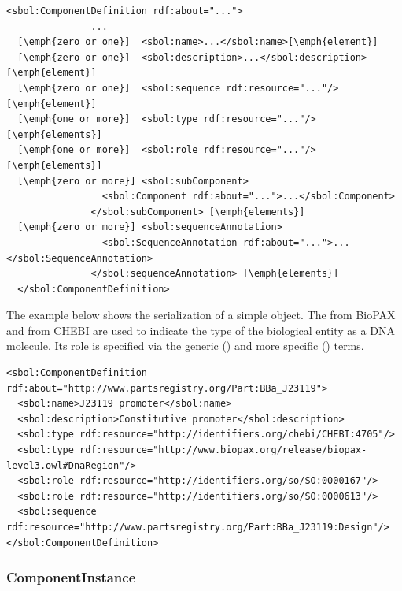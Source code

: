 \begin{lstlisting}
<sbol:ComponentDefinition rdf:about="...">
               ...
  [\emph{zero or one}]  <sbol:name>...</sbol:name>[\emph{element}]
  [\emph{zero or one}]  <sbol:description>...</sbol:description>[\emph{element}]
  [\emph{zero or one}]  <sbol:sequence rdf:resource="..."/>[\emph{element}]
  [\emph{one or more}]  <sbol:type rdf:resource="..."/>  [\emph{elements}]
  [\emph{one or more}]  <sbol:role rdf:resource="..."/>  [\emph{elements}]    
  [\emph{zero or more}] <sbol:subComponent>
                 <sbol:Component rdf:about="...">...</sbol:Component>
               </sbol:subComponent> [\emph{elements}]
  [\emph{zero or more}] <sbol:sequenceAnnotation>
                 <sbol:SequenceAnnotation rdf:about="...">...</sbol:SequenceAnnotation>
               </sbol:sequenceAnnotation> [\emph{elements}]        
  </sbol:ComponentDefinition>
\end{lstlisting}

The example below shows the serialization of a simple  object. The  from BioPAX and  from CHEBI are used to indicate the type of the biological entity as a DNA molecule. Its role is specified via the generic  () and more specific  () terms.

\begin{lstlisting}
<sbol:ComponentDefinition rdf:about="http://www.partsregistry.org/Part:BBa_J23119">
  <sbol:name>J23119 promoter</sbol:name>
  <sbol:description>Constitutive promoter</sbol:description>
  <sbol:type rdf:resource="http://identifiers.org/chebi/CHEBI:4705"/>
  <sbol:type rdf:resource="http://www.biopax.org/release/biopax-level3.owl#DnaRegion"/>
  <sbol:role rdf:resource="http://identifiers.org/so/SO:0000167"/>
  <sbol:role rdf:resource="http://identifiers.org/so/SO:0000613"/>
  <sbol:sequence rdf:resource="http://www.partsregistry.org/Part:BBa_J23119:Design"/>
</sbol:ComponentDefinition>
\end{lstlisting}


\subsubsection{ComponentInstance}
\label{sec:ComponentInstance}

